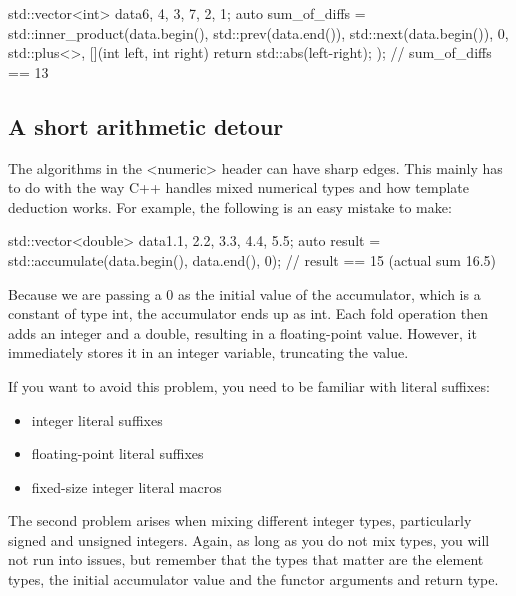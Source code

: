 \begin{box-note}
\begin{cppcode}
std::vector<int> data{6, 4, 3, 7, 2, 1};
auto sum_of_diffs = std::inner_product(data.begin(), std::prev(data.end()), 
                                       std::next(data.begin()), 
                                       0, std::plus<>{}, 
                                       [](int left, int right) { return std::abs(left-right); });
// sum_of_diffs == 13
\end{cppcode}
\end{box-note}

\subsection{A short arithmetic detour}

The algorithms in the <numeric> header can have sharp edges. This mainly has to do with the way C++ handles mixed numerical types and how template deduction works. For example, the following is an easy mistake to make:

\begin{box-note}
\begin{cppcode}
std::vector<double> data{1.1, 2.2, 3.3, 4.4, 5.5};
auto result = std::accumulate(data.begin(), data.end(), 0);
// result == 15 (actual sum 16.5)
\end{cppcode}
\end{box-note}

Because we are passing a 0 as the initial value of the accumulator, which is a constant of type int, the accumulator ends up as int. Each fold operation then adds an integer and a double, resulting in a floating-point value. However, it immediately stores it in an integer variable, truncating the value.

If you want to avoid this problem, you need to be familiar with literal suffixes:

\begin{itemize}
    \item integer literal suffixes
    \item floating-point literal suffixes
    \item fixed-size integer literal macros
\end{itemize}

The second problem arises when mixing different integer types, particularly signed and unsigned integers. Again, as long as you do not mix types, you will not run into issues, but remember that the types that matter are the element types, the initial accumulator value and the functor arguments and return type.


